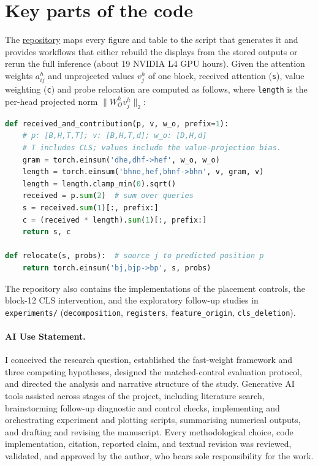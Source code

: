\section{Key parts of the code}
\label{app:code}
The \href{https://github.com/hhuang999/DSAA2012-vit-fastweight}{repository} maps every figure and table to the script that generates it and provides workflows that either rebuild the displays from the stored outputs or rerun the full inference (about 19 NVIDIA L4 GPU hours). Given the attention weights $a_{ij}^h$ and unprojected values $v_j^h$ of one block, received attention (\texttt{s}), value weighting (\texttt{c}) and probe relocation are computed as follows, where \texttt{length} is the per-head projected norm $\lVert W_O^h v_j^h\rVert_2$:
\begin{lstlisting}[language=Python]
def received_and_contribution(p, v, w_o, prefix=1):
    # p: [B,H,T,T]; v: [B,H,T,d]; w_o: [D,H,d]
    # T includes CLS; values include the value-projection bias.
    gram = torch.einsum('dhe,dhf->hef', w_o, w_o)
    length = torch.einsum('bhne,hef,bhnf->bhn', v, gram, v)
    length = length.clamp_min(0).sqrt()
    received = p.sum(2)  # sum over queries
    s = received.sum(1)[:, prefix:]
    c = (received * length).sum(1)[:, prefix:]
    return s, c

def relocate(s, probs):  # source j to predicted position p
    return torch.einsum('bj,bjp->bp', s, probs)
\end{lstlisting}
The repository also contains the implementations of the placement controls, the block-12 CLS intervention, and the exploratory follow-up studies in \texttt{experiments/} (\texttt{decomposition}, \texttt{registers}, \texttt{feature\_origin}, \texttt{cls\_deletion}).

\paragraph{AI Use Statement.} I conceived the research question, established the fast-weight framework and three competing hypotheses, designed the matched-control evaluation protocol, and directed the analysis and narrative structure of the study. Generative AI tools assisted across stages of the project, including literature search, brainstorming follow-up diagnostic and control checks, implementing and orchestrating experiment and plotting scripts, summarising numerical outputs, and drafting and revising the manuscript. Every methodological choice, code implementation, citation, reported claim, and textual revision was reviewed, validated, and approved by the author, who bears sole responsibility for the work.
